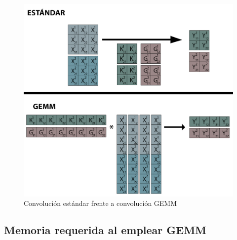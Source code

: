 \begin{figure}[H]
	\centering
	\includegraphics[scale=0.35]{imagenes/conv_std_vs_gemm.jpg}  
	\caption{Convolución estándar frente a convolución GEMM}
	\label{fig:conv_std_vs_gemm}
\end{figure}

\subsection{Memoria requerida al emplear GEMM}

